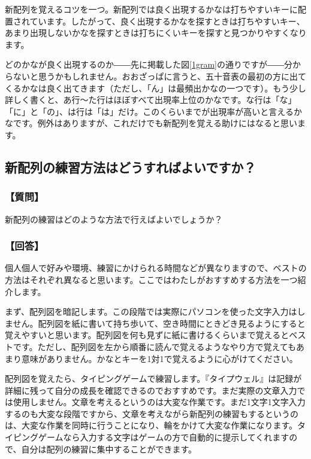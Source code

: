 新配列を覚えるコツを一つ。新配列では良く出現するかなは打ちやすいキーに配置されています。したがって、良く出現するかなを探すときは打ちやすいキー、あまり出現しないかなを探すときは打ちにくいキーを探すと見つかりやすくなります。

どのかなが良く出現するのか――先に掲載した図\ref{1gram}の通りですが――分からないと思うかもしれません。おおざっぱに言うと、五十音表の最初の方に出てくるかなは良く出てきます（ただし、「ん」は最頻出かなの一つです）。もう少し詳しく書くと、あ行～た行はほぼすべて出現率上位のかなです。な行は「な」「に」と「の」、は行は「は」だけ。このくらいまでが出現率が高いと言えるかなです。例外はありますが、これだけでも新配列を覚える助けにはなると思います。

\subsection{新配列の練習方法はどうすればよいですか？}

\subsubsection*{【質問】}

新配列の練習はどのような方法で行えばよいでしょうか？

\subsubsection*{【回答】}

個人個人で好みや環境、練習にかけられる時間などが異なりますので、ベストの方法はそれぞれ異なると思います。ここではわたしがおすすめする方法を一つ紹介します。

まず、配列図を暗記します。この段階では実際にパソコンを使った文字入力はしません。配列図を紙に書いて持ち歩いて、空き時間にときどき見るようにすると覚えやすいと思います。配列図を何も見ずに紙に書けるくらいまで覚えるとベストです。ただし、配列図を左から順番に読んで覚えるようなやり方で覚えてもあまり意味がありません。かなとキーを1対1で覚えるように心がけてください。

配列図を覚えたら、タイピングゲームで練習します。『タイプウェル』は記録が詳細に残って自分の成長を確認できるのでおすすめです。まだ実際の文章入力では使用しません。文章を考えるというのは大変な作業です。まだ1文字1文字入力するのも大変な段階ですから、文章を考えながら新配列の練習もするというのは、大変な作業を同時に行うことになり、輪をかけて大変な作業になります。タイピングゲームなら入力する文字はゲームの方で自動的に提示してくれますので、自分は配列の練習に集中することができます。

